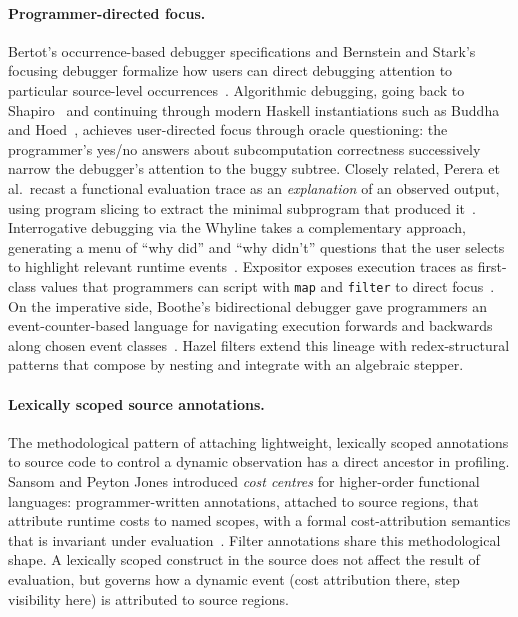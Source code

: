 \paragraph*{Programmer-directed focus.}
Bertot's occurrence-based debugger specifications and Bernstein and Stark's
focusing debugger formalize how users can direct debugging attention to
particular source-level
occurrences~\cite{bertot1991occurrences,bernstein1995focusing}. Algorithmic
debugging, going back to Shapiro~\cite{shapiro1983algorithmic} and continuing
through modern Haskell instantiations such as Buddha and
Hoed~\cite{pope2004buddha,faddegon2016hoed}, achieves user-directed focus
through oracle questioning: the programmer's yes/no answers about
subcomputation correctness successively narrow the debugger's attention to
the buggy subtree. Closely related, Perera et al.\ recast a functional
evaluation trace as an \emph{explanation} of an observed output, using
program slicing to extract the minimal subprogram that produced
it~\cite{perera2012explain}. Interrogative debugging via the
Whyline takes a complementary approach, generating a menu of ``why did'' and
``why didn't'' questions that the user selects to highlight relevant runtime
events~\cite{ko2004whyline}. Expositor exposes execution traces as first-class
values that programmers can script with \texttt{map} and \texttt{filter} to
direct focus~\cite{khoo2013expositor}. On the imperative side, Boothe's
bidirectional debugger gave programmers an event-counter-based language for
navigating execution forwards and backwards along chosen event
classes~\cite{boothe2000bidirectional}. Hazel filters extend this lineage with
redex-structural patterns that compose by nesting and integrate
with an algebraic stepper.

\paragraph*{Lexically scoped source annotations.}
The methodological pattern of attaching lightweight, lexically scoped
annotations to source code to control a dynamic observation has a direct
ancestor in profiling. Sansom and Peyton Jones introduced \emph{cost centres}
for higher-order functional languages: programmer-written annotations,
attached to source regions, that attribute runtime costs to named scopes,
with a formal cost-attribution semantics that is invariant under
evaluation~\cite{sansom1997profiling}. Filter annotations share this
methodological shape. A lexically scoped construct in the source does not
affect the result of evaluation, but governs how a dynamic event (cost
attribution there, step visibility here) is attributed to source regions.

